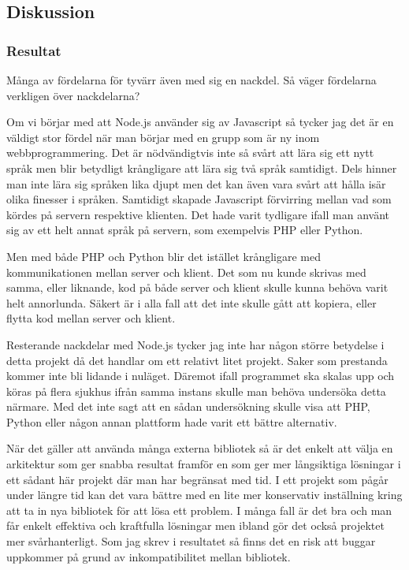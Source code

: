 \subsection{Diskussion}

\subsubsection{Resultat}

Många av fördelarna för tyvärr även med sig en nackdel. Så väger fördelarna verkligen över nackdelarna? 

Om vi börjar med att Node.js använder sig av Javascript så tycker jag det är en väldigt stor fördel när man börjar med en grupp som är ny inom webbprogrammering. Det är nödvändigtvis inte så svårt att lära sig ett nytt språk men blir betydligt krångligare att lära sig två språk samtidigt. Dels hinner man inte lära sig språken lika djupt men det kan även vara svårt att hålla isär olika finesser i språken. Samtidigt skapade Javascript förvirring mellan vad som kördes på servern respektive klienten. Det hade varit tydligare ifall man använt sig av ett helt annat språk på servern, som exempelvis PHP eller Python.

Men med både PHP och Python blir det istället krångligare med kommunikationen mellan server och klient. Det som nu kunde skrivas med samma, eller liknande, kod på både server och klient skulle kunna behöva varit helt annorlunda. Säkert är i alla fall att det inte skulle gått att kopiera, eller flytta kod mellan server och klient.

Resterande nackdelar med Node.js tycker jag inte har någon större betydelse i detta projekt då det handlar om ett relativt litet projekt. Saker som prestanda kommer inte bli lidande i nuläget. Däremot ifall programmet ska skalas upp och köras på flera sjukhus ifrån samma instans skulle man behöva undersöka detta närmare. Med det inte sagt att en sådan undersökning skulle visa att PHP, Python eller någon annan plattform hade varit ett bättre alternativ.

När det gäller att använda många externa bibliotek så är det enkelt att välja en arkitektur som ger snabba resultat framför en som ger mer långsiktiga lösningar i ett sådant här projekt där man har begränsat med tid. I ett projekt som pågår under längre tid kan det vara bättre med en lite mer konservativ inställning kring att ta in nya bibliotek för att lösa ett problem. I många fall är det bra och man får enkelt effektiva och kraftfulla lösningar men ibland gör det också projektet mer svårhanterligt. Som jag skrev i resultatet så finns det en risk att buggar uppkommer på grund av inkompatibilitet mellan bibliotek. 

